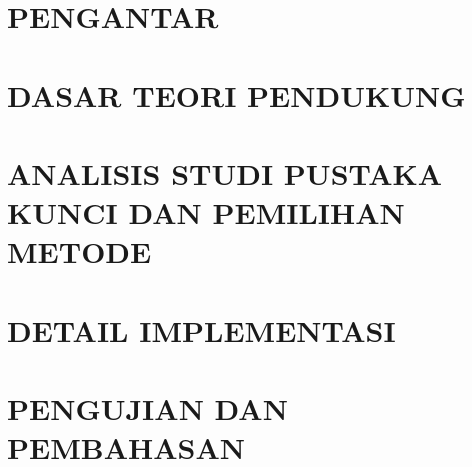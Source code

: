 \documentclass{DTETI_CP_C501}
\begin{document}
\newcommand{\covid}{COVID-19}
\newcommand{\auto}{\textit{autonomous}}
\newcommand{\lidar}{LiDAR}
\newcommand{\dev}{\textit{developer}}
\newcommand{\objd}{\textit{object recognition}}
\newcommand{\svm}{\textit{supervised machine learning}}
\newcommand{\capstone}{\textit{capstone}}
\newcommand{\node}{\textit{nodes}}



\maketitle


\chapter{\uppercase{Pengantar}}
\label{chap:Pengantar}


\chapter{\uppercase{Dasar Teori Pendukung}}
\label{chap:Dasar_Teori_Pendukung}


\chapter{\uppercase{Analisis Studi Pustaka Kunci dan Pemilihan Metode}}
\label{chap:Analisis_Studi_Pustaka_Kunci_Pemilihan_Metode}


\chapter{\uppercase{Detail Implementasi}}
\label{chap:Detail_Implementasi}


\chapter{\uppercase{Pengujian dan Pembahasan}}
\label{chap:Pengujian_Improvement_dan_Pembahasan}

\end{document}
